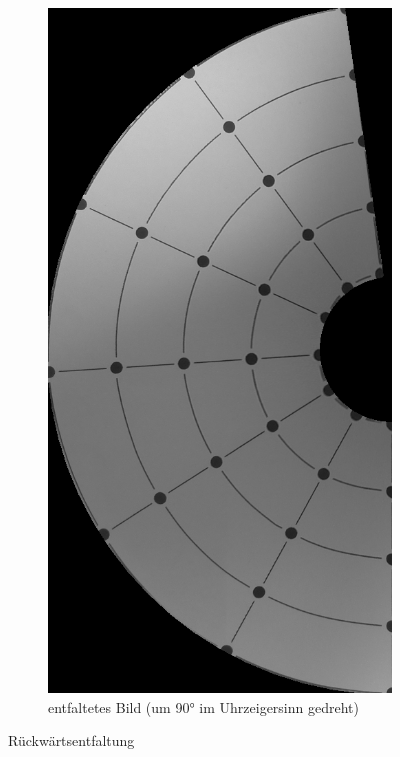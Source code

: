 \begin{figure}[!htb]
\begin{subfigure}{.5\textwidth}
		\includegraphics[angle=-90, width=.9\textwidth]{images/coneRaspUnWarpReverse.png}
		\caption{entfaltetes Bild (um 90° im Uhrzeigersinn gedreht)}
	\end{subfigure}
	\caption{Rückwärtsentfaltung}
	\label{fig:reverseUnfold}
\end{figure}
